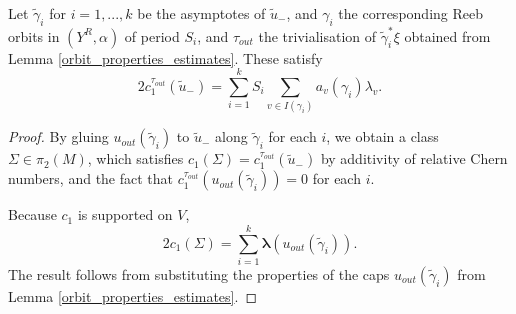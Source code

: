 \documentclass{article}
\numberwithin{equation}{section}
\numberwithin{figure}{section}
\begin{document}
\begin{lem}
Let $\tilde{\gamma}_i$ for $i=1,...,k$ be the asymptotes of $\tilde{u}_-$, and $\gamma_i$ the corresponding Reeb orbits in $(Y^R,\alpha)$ of period $S_i$, and $\tau_{out}$ the trivialisation of $\tilde{\gamma}_i^*\xi$ obtained from Lemma \ref{orbit_properties_estimates}. These satisfy
\label{total_c1}
    \begin{equation}
        2c_1^{\tau_{out}}(\tilde{u}_-)=\sum_{i=1}^kS_i\sum_{v\in I({\gamma}_i)}a_v(\gamma_i)\lambda_v.
    \end{equation}
\end{lem}
\begin{proof}
By gluing $u_{out}(\tilde{\gamma}_i)$ to $\tilde{u}_-$ along $\tilde{\gamma}_i$ for each $i$, we obtain a class $\Sigma\in \pi_2(M)$, which satisfies $c_1(\Sigma)=c_1^{\tau_{out}}(\tilde{u}_-)$ by additivity of relative Chern numbers, and the fact that $c_1^{\tau_{out}}(u_{out}(\tilde{\gamma}_i))=0$ for each $i$.

Because $c_1$ is supported on $V$, 
\begin{equation}
2c_1(\Sigma)=\sum_{i=1}^k\pmb{\lambda}(u_{out}(\tilde{\gamma}_i)).
\end{equation}
The result follows from substituting the properties of the caps $u_{out}(\tilde{\gamma}_i)$ from Lemma \ref{orbit_properties_estimates}.
\end{proof}
\end{document}
